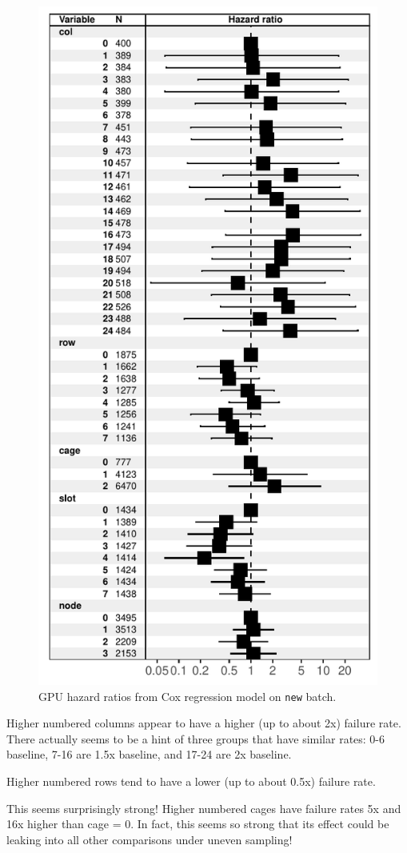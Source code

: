 \begin{figure}
  \centering
  \includegraphics[width=0.8\columnwidth]{figs/cox_n001.pdf}
  \caption{GPU hazard ratios from Cox regression model on {\tt new}
    batch.}
\end{figure}

Higher numbered columns appear to have a higher (up to about 2x)
failure rate. There actually seems to be a hint of three groups that
have similar rates: 0-6 baseline, 7-16 are 1.5x baseline, and 17-24
are 2x baseline. 

Higher numbered rows tend to have a lower (up to about 0.5x) failure rate.

This seems surprisingly strong! Higher numbered cages have failure
rates 5x and 16x higher than cage = 0. In fact, this seems so strong
that its effect could be leaking into all other comparisons under
uneven sampling!

